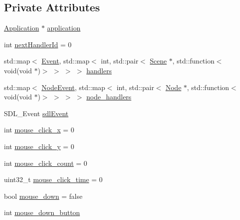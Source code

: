 \subsection*{Private Attributes}
\begin{DoxyCompactItemize}
\item 
\mbox{\hyperlink{classsage_1_1Application}{Application}} $\ast$ \mbox{\hyperlink{classsage_1_1EventDispatcher_a0c9ea12254c6806bd4252e0e336e7c81}{application}}
\item 
int \mbox{\hyperlink{classsage_1_1EventDispatcher_a45a41623356399b6a9afa584762e1897}{next\+Handler\+Id}} = 0
\item 
std\+::map$<$ \mbox{\hyperlink{namespacesage_afe706a25026cc74fe69b56d53a265d29}{Event}}, std\+::map$<$ int, std\+::pair$<$ \mbox{\hyperlink{classsage_1_1Scene}{Scene}} $\ast$, std\+::function$<$ void(void $\ast$)$>$ $>$ $>$ $>$ \mbox{\hyperlink{classsage_1_1EventDispatcher_a5c2c2d65efb97750f1b3ef8640bce768}{handlers}}
\item 
std\+::map$<$ \mbox{\hyperlink{namespacesage_ad2c7b0e1ebf67f572d43620e6b07aa13}{Node\+Event}}, std\+::map$<$ int, std\+::pair$<$ \mbox{\hyperlink{classsage_1_1Node}{Node}} $\ast$, std\+::function$<$ void(void $\ast$)$>$ $>$ $>$ $>$ \mbox{\hyperlink{classsage_1_1EventDispatcher_abd1d2825777e4be4daa9250e1cc04072}{node\+\_\+handlers}}
\item 
S\+D\+L\+\_\+\+Event \mbox{\hyperlink{classsage_1_1EventDispatcher_acc93b97b0ed92a64ab2e2040dc8ca04c}{sdl\+Event}}
\item 
int \mbox{\hyperlink{classsage_1_1EventDispatcher_a744f0db4a213a5e9d90316f991b10bcf}{mouse\+\_\+click\+\_\+x}} = 0
\item 
int \mbox{\hyperlink{classsage_1_1EventDispatcher_abf2ef4959095c77e28cd363b53d0cab2}{mouse\+\_\+click\+\_\+y}} = 0
\item 
int \mbox{\hyperlink{classsage_1_1EventDispatcher_ab66ab2cbe57fd5a7d04c130a25e042dd}{mouse\+\_\+click\+\_\+count}} = 0
\item 
uint32\+\_\+t \mbox{\hyperlink{classsage_1_1EventDispatcher_ae59ac77950d2ab74ad826220fa147ec7}{mouse\+\_\+click\+\_\+time}} = 0
\item 
bool \mbox{\hyperlink{classsage_1_1EventDispatcher_add0d3b2e04a6b55fb79bb9cee798661c}{mouse\+\_\+down}} = false
\item 
int \mbox{\hyperlink{classsage_1_1EventDispatcher_ab4e7abdcd8cedf5ecf3a662b762cf7a5}{mouse\+\_\+down\+\_\+button}}
\end{DoxyCompactItemize}


